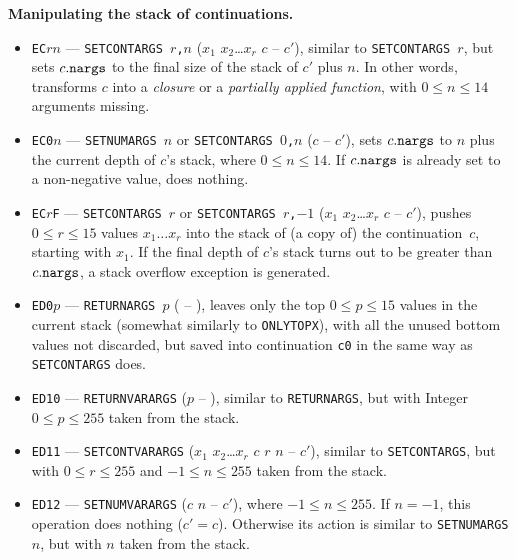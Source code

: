 \documentclass[12pt,oneside]{article}
\def\makepoint#1{\medbreak\noindent{\bf #1.\ }}
\def\nxsubpoint{\refstepcounter{subsubsection}%
    \smallbreak\makepoint{\thesubsubsection}}
\def\emb#1{\textbf{#1.}}
\begin{document}
\nxsubpoint\label{sp:cont.stk.manip}\emb{Manipulating the stack of continuations}
\begin{itemize}
\item {\tt EC$rn$} --- {\tt SETCONTARGS $r$,$n$} ($x_1$ $x_2$\dots$x_r$ $c$ -- $c'$), similar to {\tt SETCONTARGS $r$}, but sets $c.{\tt nargs}$ to the final size of the stack of $c'$ plus $n$. In other words, transforms $c$ into a {\em closure\/} or a {\em partially applied function}, with $0\leq n\leq 14$ arguments missing.
\item {\tt EC0$n$} --- {\tt SETNUMARGS $n$} or {\tt SETCONTARGS $0$,$n$} ($c$ -- $c'$), sets $c.{\tt nargs}$ to $n$ plus the current depth of $c$'s stack, where $0\leq n\leq 14$. If $c.{\tt nargs}$ is already set to a non-negative value, does nothing.
\item {\tt EC$r$F} --- {\tt SETCONTARGS $r$} or {\tt SETCONTARGS $r$,$-1$} ($x_1$ $x_2$\dots$x_r$ $c$ -- $c'$), pushes $0\leq r\leq 15$ values $x_1\ldots x_r$ into the stack of (a copy of) the continuation~$c$, starting with $x_1$. If the final depth of $c$'s stack turns out to be greater than $c.{\tt nargs}$, a stack overflow exception is generated.
\item {\tt ED0$p$} --- {\tt RETURNARGS $p$} ( -- ), leaves only the top $0\leq p\leq 15$ values in the current stack (somewhat similarly to {\tt ONLYTOPX}), with all the unused bottom values not discarded, but saved into continuation {\tt c0} in the same way as {\tt SETCONTARGS} does.
\item {\tt ED10} --- {\tt RETURNVARARGS} ($p$ -- ), similar to {\tt RETURNARGS}, but with Integer $0\leq p\leq 255$ taken from the stack.
\item {\tt ED11} --- {\tt SETCONTVARARGS} ($x_1$ $x_2$\dots$x_r$ $c$ $r$ $n$ -- $c'$), similar to {\tt SETCONTARGS}, but with $0\leq r\leq 255$ and $-1\leq n\leq 255$ taken from the stack.
\item {\tt ED12} --- {\tt SETNUMVARARGS} ($c$ $n$ -- $c'$), where $-1\leq n\leq 255$. If $n=-1$, this operation does nothing ($c'=c$). Otherwise its action is similar to {\tt SETNUMARGS $n$}, but with $n$ taken from the stack.
\end{itemize}
\end{document}
